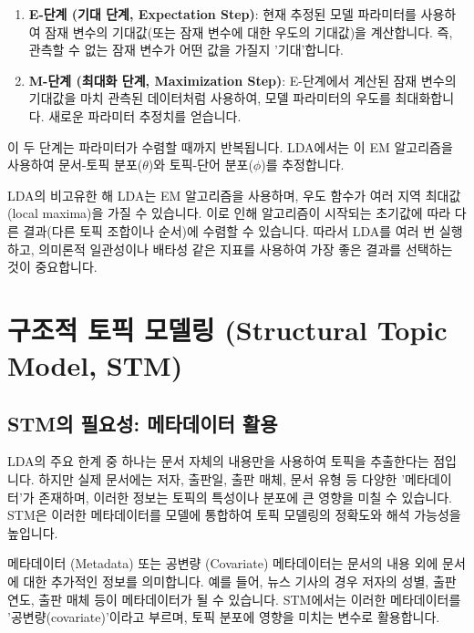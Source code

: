 \documentclass[11pt,a4paper]{article}
\begin{document}
\begin{enumerate}
    \item \textbf{E-단계 (기대 단계, Expectation Step)}: 현재 추정된 모델 파라미터를 사용하여 잠재 변수의 기대값(또는 잠재 변수에 대한 우도의 기대값)을 계산합니다. 즉, 관측할 수 없는 잠재 변수가 어떤 값을 가질지 '기대'합니다.
    \item \textbf{M-단계 (최대화 단계, Maximization Step)}: E-단계에서 계산된 잠재 변수의 기대값을 마치 관측된 데이터처럼 사용하여, 모델 파라미터의 우도를 최대화합니다. 새로운 파라미터 추정치를 얻습니다.
\end{enumerate}
이 두 단계는 파라미터가 수렴할 때까지 반복됩니다. LDA에서는 이 EM 알고리즘을 사용하여 문서-토픽 분포($\theta$)와 토픽-단어 분포($\phi$)를 추정합니다.

\begin{cautionbox}{LDA의 비고유한 해}
LDA는 EM 알고리즘을 사용하며, 우도 함수가 여러 지역 최대값(local maxima)을 가질 수 있습니다. 이로 인해 알고리즘이 시작되는 초기값에 따라 다른 결과(다른 토픽 조합이나 순서)에 수렴할 수 있습니다. 따라서 LDA를 여러 번 실행하고, 의미론적 일관성이나 배타성 같은 지표를 사용하여 가장 좋은 결과를 선택하는 것이 중요합니다.
\end{cautionbox}

\newpage
\section*{구조적 토픽 모델링 (Structural Topic Model, STM)}

\subsection{STM의 필요성: 메타데이터 활용}
LDA의 주요 한계 중 하나는 문서 자체의 내용만을 사용하여 토픽을 추출한다는 점입니다. 하지만 실제 문서에는 저자, 출판일, 출판 매체, 문서 유형 등 다양한 '메타데이터'가 존재하며, 이러한 정보는 토픽의 특성이나 분포에 큰 영향을 미칠 수 있습니다. STM은 이러한 메타데이터를 모델에 통합하여 토픽 모델링의 정확도와 해석 가능성을 높입니다.

\begin{definitionbox}{메타데이터 (Metadata) 또는 공변량 (Covariate)}
메타데이터는 문서의 내용 외에 문서에 대한 추가적인 정보를 의미합니다. 예를 들어, 뉴스 기사의 경우 저자의 성별, 출판 연도, 출판 매체 등이 메타데이터가 될 수 있습니다. STM에서는 이러한 메타데이터를 '공변량(covariate)'이라고 부르며, 토픽 분포에 영향을 미치는 변수로 활용합니다.
\end{definitionbox}
\end{document}
